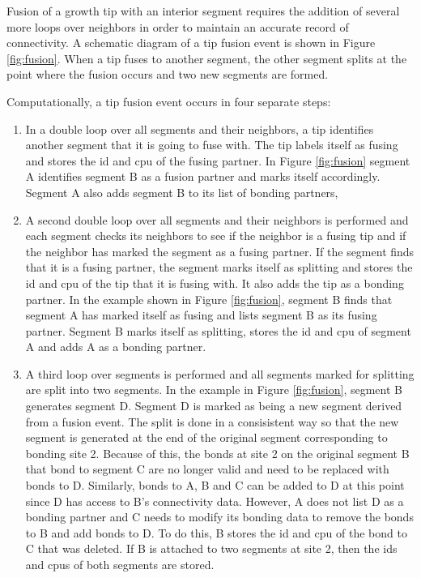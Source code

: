 \documentclass[12pt]{article}
\begin{document}
Fusion of a growth tip with an interior segment requires the addition of several more loops
over neighbors in order to maintain an accurate record of connectivity. A schematic diagram
of a tip fusion event is shown in Figure \ref{fig:fusion}. When a tip fuses to another segment,
the other segment splits at the point where the fusion occurs and two new segments are formed.

Computationally, a tip fusion event occurs in four separate steps:
\begin{enumerate}
\item In a double loop over all segments and their neighbors, a tip identifies another segment
that it is going to fuse with. The tip labels itself as fusing and stores the id and cpu of the
fusing partner. In Figure \ref{fig:fusion} segment A identifies segment B as a fusion partner
and marks itself accordingly. Segment A also adds segment B to its list of bonding partners,
\item A second double loop over all segments and their neighbors is performed and each segment
checks its neighbors to see if the neighbor is a fusing tip and if the neighbor has marked the
segment as a fusing
partner. If the segment finds that it is a fusing partner, the segment marks itself as
splitting and
stores the id and cpu of the tip that it is fusing with. It also adds the tip as a bonding
partner. In the example shown in Figure \ref{fig:fusion}, segment B finds that segment A has
marked itself as fusing and lists segment B as its fusing partner. Segment B marks itself as
splitting, stores the id and cpu of segment A and adds A as a bonding partner.
\item A third loop over segments is performed and all segments marked for splitting are split
into two segments. In the example in Figure \ref{fig:fusion}, segment B generates segment D.
Segment D is marked as being a new segment derived from a fusion event.
The split is done in a consisistent way so that the new segment is generated at the end of the
original segment corresponding to bonding site 2. Because of this, the bonds at site 2 on the
original segment B that bond to segment C are no longer valid and need to be replaced with bonds to D.
Similarly, bonds to A, B and C can be added to D at this point since D has access to B's
connectivity data. However, A does not list D as a bonding partner and C needs to modify its
bonding data to remove the bonds to B and add bonds to D. To do this, B stores the id and cpu
of the bond to C that was deleted. If B is attached to two segments at site 2, then the ids and
cpus of both segments are stored.


\end{enumerate}
\end{document}
